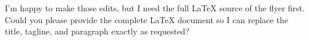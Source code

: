 I’m happy to make those edits, but I need the full LaTeX source of the flyer first. Could you please provide the complete LaTeX document so I can replace the title, tagline, and paragraph exactly as requested?